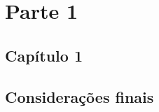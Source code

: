 \documentclass[
	12pt,				%
	openright,			%
	twoside,			%
	a4paper,			%
	chapter=TITLE,		%
	sumario=abnt-6027-2012,
	english,			%
	brazil				%
	]{UFVJM-abntex2}
\begin{document}



\part{Parte 1}

\chapter*{Capítulo 1}







\chapter*{Considerações finais}











\postextual
\end{document}

